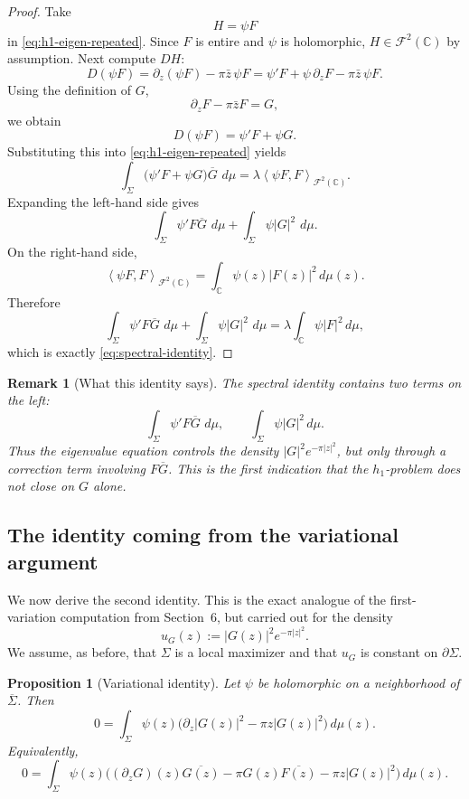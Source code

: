 \documentclass[11pt]{article}
\newtheorem{proposition}[theorem]{Proposition}
\newtheorem{remark}[theorem]{Remark}
\newcommand{\C}{\mathbb C}
\newcommand{\F}{\mathcal F^2(\C)}
\newcommand{\dmu}{\,d\mu}
\newcommand{\pw}{\partial_z}
\newcommand{\1}{\mathbf 1}
\newcommand{\inner}[2]{\left\langle #1,#2\right\rangle}
\newcommand{\abs}[1]{\left|#1\right|}
\begin{document}
\begin{proof}
Take
\[
H=\psi F
\]
in \eqref{eq:h1-eigen-repeated}. Since \(F\) is entire and \(\psi\) is holomorphic,
\(H\in\F\) by assumption. Next compute \(DH\):
\[
D(\psi F)
=
\pw(\psi F)-\pi\bar z\,\psi F
=
\psi'F+\psi\,\pw F-\pi\bar z\,\psi F.
\]
Using the definition of \(G\),
\[
\pw F-\pi\bar z F = G,
\]
we obtain
\[
D(\psi F)=\psi'F+\psi G.
\]
Substituting this into \eqref{eq:h1-eigen-repeated} yields
\[
\int_\Sigma \big(\psi'F+\psi G\big)\overline G\,\dmu
=
\lambda \inner{\psi F}{F}_{\F}.
\]
Expanding the left-hand side gives
\[
\int_\Sigma \psi'F\overline G\,\dmu
+
\int_\Sigma \psi |G|^2\,\dmu.
\]
On the right-hand side,
\[
\inner{\psi F}{F}_{\F}
=
\int_\C \psi(z)\abs{F(z)}^2\dmu(z).
\]
Therefore
\[
\int_\Sigma \psi'F\overline G\,\dmu
+
\int_\Sigma \psi |G|^2\,\dmu
=
\lambda\int_\C \psi\abs{F}^2\dmu,
\]
which is exactly \eqref{eq:spectral-identity}.
\end{proof}

\begin{remark}[What this identity says]
The spectral identity contains two terms on the left:
\[
\int_\Sigma \psi'F\overline G\,\dmu,
\qquad
\int_\Sigma \psi |G|^2\dmu.
\]
Thus the eigenvalue equation controls the density \(|G|^2e^{-\pi|z|^2}\), but only
through a correction term involving \(F\overline G\). This is the first indication
that the \(h_1\)-problem does not close on \(G\) alone.
\end{remark}

\subsection{The identity coming from the variational argument}

We now derive the second identity. This is the exact analogue of the first-variation
computation from Section~6, but carried out for the density
\[
u_G(z):=\abs{G(z)}^2e^{-\pi|z|^2}.
\]
We assume, as before, that \(\Sigma\) is a local maximizer and that \(u_G\) is
constant on \(\partial\Sigma\).

\begin{proposition}[Variational identity]\label{prop:variational-identity}
Let \(\psi\) be holomorphic on a neighborhood of \(\overline\Sigma\). Then
\begin{equation}\label{eq:variational-identity-raw}
0
=
\int_\Sigma \psi(z)\Big(\pw |G(z)|^2-\pi z|G(z)|^2\Big)\dmu(z).
\end{equation}
Equivalently,
\begin{equation}\label{eq:variational-identity}
0
=
\int_\Sigma
\psi(z)\Big((\pw G)(z)\overline{G(z)}
-\pi G(z)\overline{F(z)}
-\pi z|G(z)|^2\Big)\dmu(z).
\end{equation}
\end{proposition}
\end{document}
